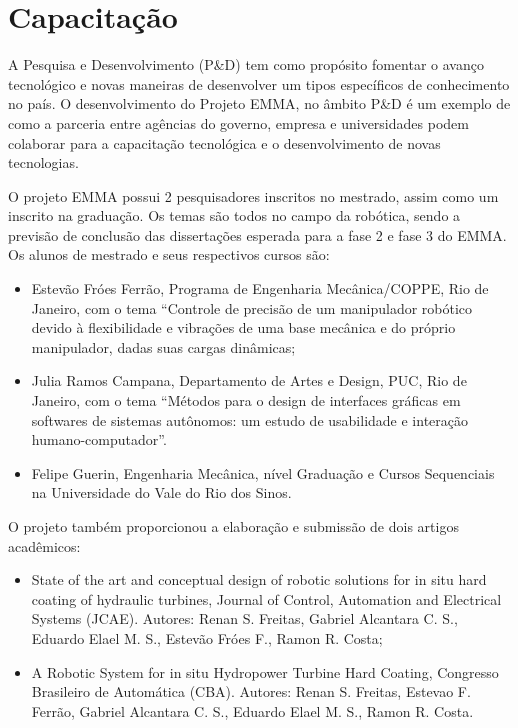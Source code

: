 \section{Capacitação}

A Pesquisa e Desenvolvimento (P\&D) tem como propósito fomentar o avanço
tecnológico e novas maneiras de desenvolver um tipos específicos de conhecimento
no país. O desenvolvimento do Projeto EMMA, no âmbito P\&D é um exemplo de como
a parceria entre agências do governo, empresa e universidades podem colaborar para
a capacitação tecnológica e o desenvolvimento de novas tecnologias.

O projeto EMMA possui 2 pesquisadores inscritos no mestrado, assim como um
inscrito na graduação.
Os temas são todos no campo da robótica, sendo a previsão de conclusão das dissertações
esperada para a fase 2 e fase 3 do EMMA. Os alunos de mestrado e seus
respectivos cursos são:

\begin{itemize}
  \item Estevão Fróes Ferrão, Programa de Engenharia Mecânica/COPPE, Rio de
  Janeiro, com o tema ``Controle de precisão de um manipulador robótico devido à
  flexibilidade e vibrações de uma base mecânica e do próprio manipulador, dadas
  suas cargas dinâmicas;
  \item Julia Ramos Campana, Departamento de Artes e Design, PUC, Rio de
  Janeiro, com o tema ``Métodos para o design de interfaces gráficas em
softwares de sistemas autônomos: um estudo de usabilidade e interação
humano-computador''.
 \item Felipe Guerin, Engenharia Mecânica, nível Graduação e Cursos Sequenciais
 na Universidade do Vale do Rio dos Sinos.
\end{itemize}
O projeto também proporcionou a elaboração e submissão de dois artigos
acadêmicos:

\begin{itemize}
  \item State of the art and conceptual design of robotic solutions for in situ
  hard coating of hydraulic turbines, Journal of Control, Automation and
  Electrical Systems (JCAE). Autores: Renan S. Freitas, Gabriel Alcantara C. S.,
  Eduardo Elael M. S., Estevão Fróes F., Ramon R. Costa;
  \item A Robotic System for in situ Hydropower Turbine Hard Coating, Congresso
  Brasileiro de Automática (CBA). Autores: Renan S. Freitas, Estevao F. Ferrão,
  Gabriel Alcantara C. S., Eduardo Elael M. S., Ramon R. Costa.
\end{itemize}

